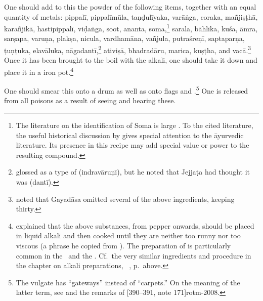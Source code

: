 \begin{translation}
One should add to this the powder of the following items, together
with an equal quantity of metals: \gls{pippalī}, \gls{pippalīmūla},
\gls{taṇḍulīyaka}, \gls{varāṅga}, \gls{coraka}, \gls{mañjiṣṭhā},
\gls{karañjikā}, \gls{hastipippalī}, \gls{viḍaṅga},
soot, \gls{ananta}, soma,\footnote{The literature on the identification of Soma is
    large \citep[passim]{wuja-2003}. To the cited literature, the useful
    historical discussion by \citet[449--455]{gvdb} gives special
    attention to the āyurvedic literature.  Its presence in this recipe
    may add special value or power to the resulting compound.}
    \gls{sarala}, \gls{bāhlīka}, \gls{kuśa}, \gls{āmra}, \gls{sarṣapa},
    \gls{varuṇa}, \gls{plakṣa}, \gls{nicula}, \gls{vardhamāna},
    \gls{vañjula}, \gls{putraśreṇī}, \gls{saptaparṇa}, \gls{ṭuṇṭuka},
    \gls{elavāluka}, \gls{nāgadantī},\footnote{
        glossed  as a type of 
        (\gls{indravāruṇī}), but he noted that Jejjaṭa had thought it was
         (\gls{dantī}).} \gls{ativiṣā}, \gls{bhadradāru},
        \gls{marica}, \gls{kuṣṭha}, and
        \gls{vacā}.\footnote{ noted that Gayadāsa omitted
            several of the above ingredients, keeping thirty.}  Once it has been
            brought to the boil with the alkali, one should take it down and
            place it in a iron
            pot.\footnote{\label{kṣārapāka2} explained that
                the above substances, from pepper onwards, should be placed in 
                liquid
                alkali and then cooked until they are neither too runny nor too
                viscous (a phrase he copied from ).  The 
                preparation
                of  is particularly common in the \SS\ and the \AH.  Cf.\
                the very similar ingredients and procedure in the chapter on alkali
                preparations, \SS\ \Su{1.11.11}{46--47}, p.\,\pageref{kṣārapāka}
                above.}
                
\item[4]    

One should smear this onto a drum as well as onto flags and
.\footnote{The vulgate has  “gateways”
    instead of \dev{āstaraṇa} “carpets.”  On the meaning of the latter
    term, see \cite[31, 33 \emph{et passim}]{bail-1970} and the remarks
   of \tvolcite{1}[390--391, note 171]{rotm-2008}.} One is released
    from all poisons as a result of seeing and hearing these.


\end{translation}
